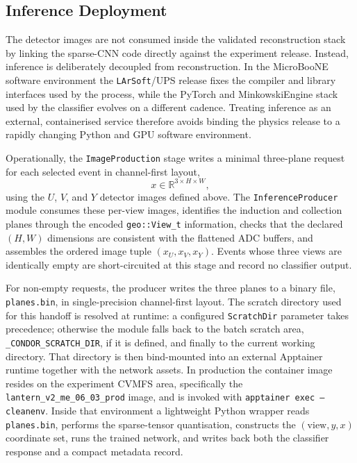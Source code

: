 \subsection{Inference Deployment}
The detector images are not consumed inside the validated reconstruction stack
by linking the sparse-CNN code directly against the experiment release.
Instead, inference is deliberately decoupled from reconstruction. In the
MicroBooNE software environment the \texttt{LArSoft}/UPS release fixes the
compiler and library interfaces used by the process, while the PyTorch and
MinkowskiEngine stack used by the classifier evolves on a different cadence.
Treating inference as an external, containerised service therefore avoids
binding the physics release to a rapidly changing Python and GPU software
environment.

Operationally, the \texttt{ImageProduction} stage writes a minimal three-plane
request for each selected event in channel-first layout,
\[
x \in \mathbb{R}^{3\times H\times W},
\]
using the \(U\), \(V\), and \(Y\) detector images defined above. The
\texttt{InferenceProducer} module consumes these per-view images, identifies the
induction and collection planes through the encoded \texttt{geo::View\_t}
information, checks that the declared \((H,W)\) dimensions are consistent with
the flattened ADC buffers, and assembles the ordered image tuple
\((x_U,x_V,x_Y)\). Events whose three views are identically empty are
short-circuited at this stage and record no classifier output.

For non-empty requests, the producer writes the three planes to a binary file,
\texttt{planes.bin}, in single-precision channel-first layout. The scratch
directory used for this handoff is resolved at runtime: a configured
\texttt{ScratchDir} parameter takes precedence; otherwise the module falls back
to the batch scratch area, \texttt{\_CONDOR\_SCRATCH\_DIR}, if it is defined,
and finally to the current working directory. That directory is then
bind-mounted into an external Apptainer runtime together with the network
assets. In production the container image resides on the experiment CVMFS area,
specifically the \texttt{lantern\_v2\_me\_06\_03\_prod} image, and is invoked
with \texttt{apptainer exec --cleanenv}. Inside that environment a lightweight
Python wrapper reads \texttt{planes.bin}, performs the sparse-tensor
quantisation, constructs the \((\mathrm{view},y,x)\) coordinate set, runs the
trained network, and writes back both the classifier response and a compact
metadata record.

